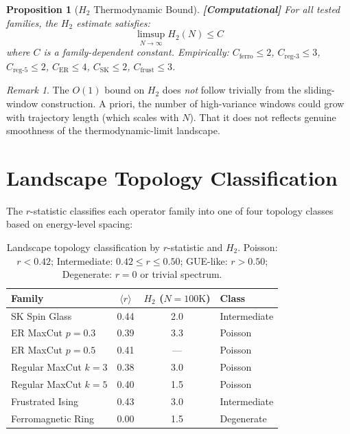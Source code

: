 \documentclass[12pt,a4paper]{article}
\newcommand{\computational}[1]{\textcolor{computational}{\textbf{[Computational]}} #1}
\newtheorem{proposition}[theorem]{Proposition}
\theoremstyle{definition}\newtheorem{definition}[theorem]{Definition}
\theoremstyle{remark}\newtheorem{remark}[theorem]{Remark}
\newcommand{\Htwo}{H_2}
\begin{document}
\begin{proposition}[$\Htwo$ Thermodynamic Bound]
\label{prop:thermo}
\computational{For all tested families, the $\Htwo$ estimate satisfies:}
\begin{equation}
  \limsup_{N \to \infty} \Htwo(N) \leq C
\end{equation}
where $C$ is a family-dependent constant. Empirically:
$C_{\mathrm{ferro}} \leq 2$,
$C_{\mathrm{reg}\text{-}3} \leq 3$,
$C_{\mathrm{reg}\text{-}5} \leq 2$,
$C_{\mathrm{ER}} \leq 4$,
$C_{\mathrm{SK}} \leq 2$,
$C_{\mathrm{frust}} \leq 3$.
\end{proposition}

\begin{remark}
The $O(1)$ bound on $\Htwo$ does \emph{not} follow trivially from the
sliding-window construction. A priori, the number of high-variance windows
could grow with trajectory length (which scales with $N$). That it does not
reflects genuine smoothness of the thermodynamic-limit landscape.
\end{remark}

\section{Landscape Topology Classification}
\label{sec:classification}

The $r$-statistic classifies each operator family into one of four topology
classes based on energy-level spacing:

\begin{table}[H]
\centering
\caption{Landscape topology classification by $r$-statistic and $\Htwo$.
Poisson: $r < 0.42$; Intermediate: $0.42 \leq r \leq 0.50$; GUE-like:
$r > 0.50$; Degenerate: $r = 0$ or trivial spectrum.}
\label{tab:classification}
\begin{tabular}{@{}lccl@{}}
\toprule
\textbf{Family} & $\langle r \rangle$ & $\Htwo$ ($N\!=\!100\mathrm{K}$) & \textbf{Class} \\
\midrule
SK Spin Glass          & 0.44 & 2.0  & Intermediate \\
ER MaxCut $p=0.3$      & 0.39 & 3.3  & Poisson \\
ER MaxCut $p=0.5$      & 0.41 & ---  & Poisson \\
Regular MaxCut $k=3$   & 0.38 & 3.0  & Poisson \\
Regular MaxCut $k=5$   & 0.40 & 1.5  & Poisson \\
Frustrated Ising       & 0.43 & 3.0  & Intermediate \\
Ferromagnetic Ring     & 0.00 & 1.5  & Degenerate \\
\bottomrule
\end{tabular}
\end{table}
\end{document}
